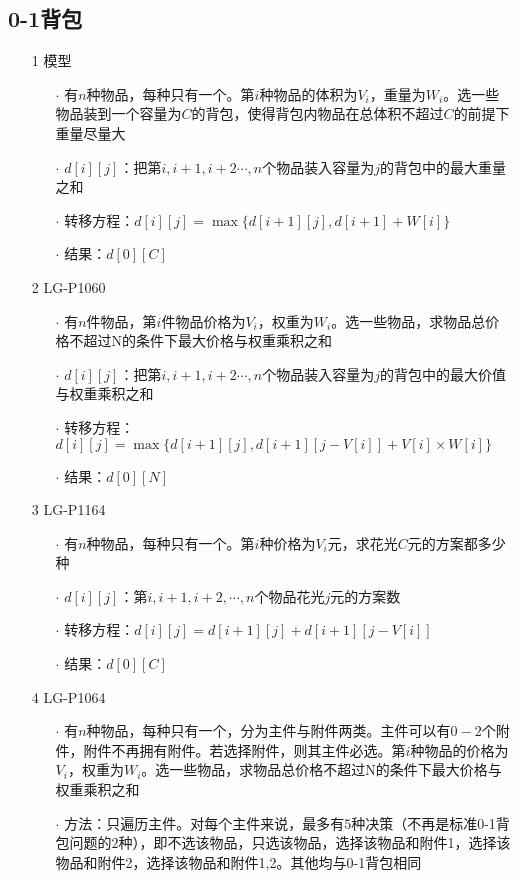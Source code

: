 \subsection{0-1背包}
\begin{itemize}
	\item[1] 模型
		\begin{itemize}
			\item[$\cdot$] 有$n$种物品，每种只有一个。第$i$种物品的体积为$V_i$，重量为$W_i$。选一些物品装到一个容量为$C$的背包，使得背包内物品在总体积不超过$C$的前提下重量尽量大
			\item[$\cdot$] $d[i][j]$：把第$i,i+1,i+2\cdots,n$个物品装入容量为$j$的背包中的最大重量之和
			\item[$\cdot$] 转移方程：$d[i][j]=\max{\{d[i+1][j],d[i+1]+W[i]\}}$
			\item[$\cdot$] 结果：$d[0][C]$   
		\end{itemize}
	\item[2] LG-P1060
		\begin{itemize}
			\item[$\cdot$] 有$n$件物品，第$i$件物品价格为$V_i$，权重为$W_i$。选一些物品，求物品总价格不超过N的条件下最大价格与权重乘积之和
			\item[$\cdot$] $d[i][j]$：把第$i,i+1,i+2\cdots,n$个物品装入容量为$j$的背包中的最大价值与权重乘积之和
			\item[$\cdot$] 转移方程：$d[i][j]=\max{\{d[i+1][j],d[i+1][j-V[i]]+V[i]\times W[i]\}}$
			\item[$\cdot$] 结果：$d[0][N]$
		\end{itemize}
	\item[3] LG-P1164
		\begin{itemize}
			\item[$\cdot$] 有$n$种物品，每种只有一个。第$i$种价格为$V_i$元，求花光$C$元的方案都多少种
			\item[$\cdot$] $d[i][j]$：第$i,i+1,i+2,\cdots,n$个物品花光$j$元的方案数
			\item[$\cdot$] 转移方程：$d[i][j]=d[i+1][j]+d[i+1][j-V[i]]$
			\item[$\cdot$] 结果：$d[0][C]$
		\end{itemize}
	\item[4] LG-P1064
		\begin{itemize}
			\item[$\cdot$] 有$n$种物品，每种只有一个，分为主件与附件两类。主件可以有$0-2$个附件，附件不再拥有附件。若选择附件，则其主件必选。第$i$种物品的价格为$V_i$，权重为$W_i$。选一些物品，求物品总价格不超过N的条件下最大价格与权重乘积之和
        	\item[$\cdot$] 方法：只遍历主件。对每个主件来说，最多有$5$种决策（不再是标准0-1背包问题的$2$种），即不选该物品，只选该物品，选择该物品和附件1，选择该物品和附件2，选择该物品和附件1,2。其他均与0-1背包相同
		\end{itemize}
\end{itemize}
